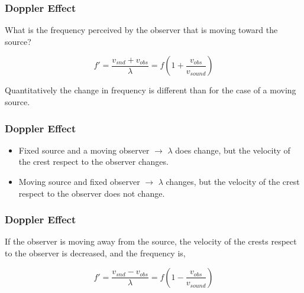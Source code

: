 \documentclass[]{beamer}
\begin{document}

\begin{frame}
\frametitle{Doppler Effect}


What is the frequency perceived by the observer that is moving toward the source?

\begin{equation}
f'=\frac{v_{snd}+v_{obs}}{\lambda}=f\left(1+\frac{v_{obs}}{v_{sound}}\right)
\end{equation}



\pause
\vspace{5mm}

Quantitatively the change in frequency is different
than for the case of a moving source. 



  \end{frame}





\begin{frame}
\frametitle{Doppler Effect}



\begin{itemize}
\item Fixed source and a moving observer $\rightarrow$ $\lambda$ does change, but the velocity of the crest respect to the observer changes.\pause
\item Moving source and fixed observer  $\rightarrow$ $\lambda$ changes, but the velocity of the crest respect to the observer does not change. 
\end{itemize}

  \end{frame}





\begin{frame}
\frametitle{Doppler Effect}



If the observer is moving away from the source, the velocity of the crests respect to the observer is decreased, and the frequency is,
\pause

\vspace{5mm}

\begin{equation}
f'=\frac{v_{snd}-v_{obs}}{\lambda}=f\left(1-\frac{v_{obs}}{v_{sound}}\right)
\end{equation}

  \end{frame}
\end{document}
